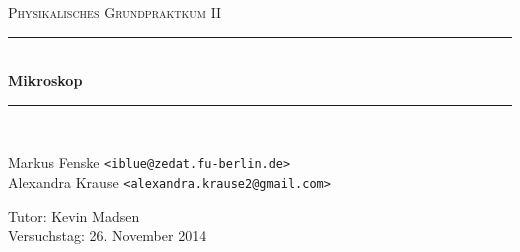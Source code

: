 \newcommand{\HRule}{\rule{\linewidth}{0.5mm}}

\begin{center}
  \textsc{\Large Physikalisches Grundpraktkum II}
  \HRule\\[0.4 cm]
  {\huge \bfseries Mikroskop}
  \HRule\\[0.4 cm]

  \begin{minipage}{0.60\textwidth}
  \begin{flushleft}
    Markus Fenske \texttt{<iblue@zedat.fu-berlin.de>} \\
    Alexandra Krause \texttt{<alexandra.krause2@gmail.com>}
  \end{flushleft}
  \end{minipage}
  \hfill
  \begin{minipage}{0.35\textwidth}
  \begin{flushright}
    Tutor: Kevin Madsen \\
    Versuchstag: 26. November 2014
  \end{flushright}
  \end{minipage}

  \vspace{1cm}

  \tableofcontents


  \vfill
\end{center}
\newpage
